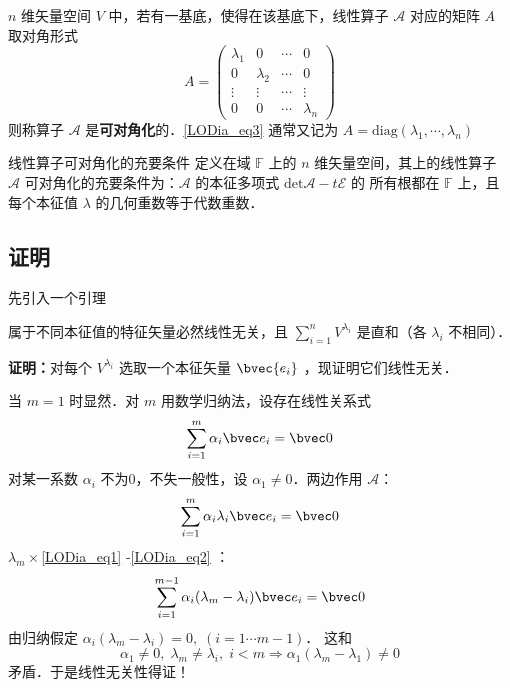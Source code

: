 \begin{definition}{}
 $n$ 维矢量空间 $V$ 中，若有一基底，使得在该基底下，线性算子 $\mathcal{A}$ 对应的矩阵 $A$ 取对角形式
 \begin{equation}\label{LODia_eq3}
 A=\begin{pmatrix}
 \lambda_1&0&\cdots&0\\
 0&\lambda_2&\cdots&0\\
 \vdots&\vdots&\cdots&\vdots\\
 0&0&\cdots&\lambda_n
 \end{pmatrix}
 \end{equation}
 则称算子 $\mathcal{A}$ 是\textbf{可对角化}的．\autoref{LODia_eq3} 通常又记为 $A=\mathrm{diag}(\lambda_1,\cdots,\lambda_n)$
\end{definition}
\begin{theorem}{线性算子可对角化的充要条件}\label{LODia_the1}
定义在域 $\mathbb{F}$ 上的 $n$ 维矢量空间，其上的线性算子 $\mathcal{A}$ 可对角化的充要条件为：$\mathcal{A}$ 的本征多项式 $\mathrm{det}{\mathcal{A}-t \mathcal{E}}$ 的 所有根都在 $\mathbb{F}$ 上，且每个本征值 $\lambda$ 的几何重数等于代数重数．
\end{theorem}
\subsection{证明}
先引入一个引理
\begin{lemma}{}\label{LODia_lem1}
属于不同本征值的特征矢量必然线性无关，且 $\sum\limits_{i=1}^nV^{\lambda_i}$ 是直和（各 $\lambda_i$ 不相同）．
\end{lemma}
\textbf{证明：}对每个 $V^{\lambda_i}$ 选取一个本征矢量 $\bvec{e_i}$ ，现证明它们线性无关．

当 $m=1$ 时显然．对 $m$ 用数学归纳法，设存在线性关系式
\begin{equation}\label{LODia_eq1}
\sum_{i=1}^{m}\alpha_i\bvec e_i=\bvec 0
\end{equation}
对某一系数 $\alpha_i$ 不为0，不失一般性，设 $\alpha_1\neq0$．两边作用 $\mathcal A$：
\begin{equation}\label{LODia_eq2}
\sum_{i=1}^m\alpha_i\lambda_i\bvec e_i=\bvec 0
\end{equation}
$\lambda_m\times$\autoref{LODia_eq1} -\autoref{LODia_eq2} ：
\begin{equation}
\sum_{i=1}^{m-1}\alpha_i(\lambda_m-\lambda_i)\bvec e_i=\bvec 0
\end{equation}
由归纳假定 $\alpha_i(\lambda_m-\lambda_i)=0,\;(i=1\cdots m-1)$． 这和
\begin{equation}
\alpha_1\ne0,\;\lambda_m\neq\lambda_i,\;i<m\Rightarrow \alpha_1(\lambda
_m-\lambda_1)\neq0
\end{equation}
矛盾．于是线性无关性得证！

